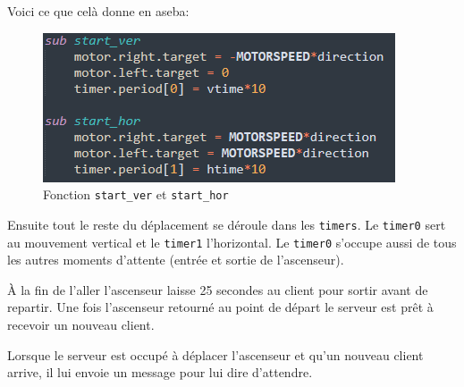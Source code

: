Voici ce que celà donne en aseba:

\begin{figure}[H]
	\centering
	\includegraphics{code/server_direction_moving}
	\caption{Fonction \texttt{start\_ver} et \texttt{start\_hor}}
	\label{fig:startdirection}
\end{figure}

Ensuite tout le reste du déplacement se déroule dans les \texttt{timers}. Le \texttt{timer0} sert au mouvement vertical et le \texttt{timer1} l'horizontal. Le \texttt{timer0} s'occupe aussi de tous les autres moments d'attente (entrée et sortie de l'ascenseur).

À la fin de l'aller l'ascenseur laisse 25 secondes au client pour sortir avant de repartir. Une fois l'ascenseur retourné au point de départ le serveur est prêt à recevoir un nouveau client.

Lorsque le serveur est occupé à déplacer l'ascenseur et qu'un nouveau client arrive, il lui envoie un message pour lui dire d'attendre.
